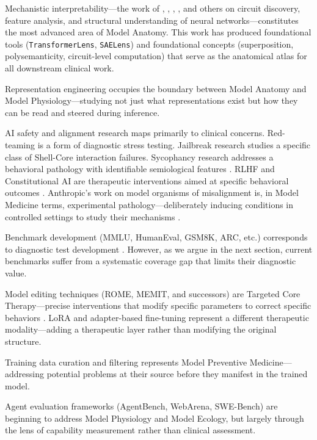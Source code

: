 \documentclass[11pt]{article}
\begin{document}
Mechanistic interpretability---the work of \citet{Olah2020}, \citet{Nanda2022}, \citet{Elhage2022}, \citet{Conmy2023}, and others on circuit discovery, feature analysis, and structural understanding of neural networks---constitutes the most advanced area of Model Anatomy. This work has produced foundational tools (\texttt{TransformerLens}, \texttt{SAELens}) and foundational concepts (superposition, polysemanticity, circuit-level computation) that serve as the anatomical atlas for all downstream clinical work.

Representation engineering \citep{Zou2023} occupies the boundary between Model Anatomy and Model Physiology---studying not just what representations exist but how they can be read and steered during inference.

AI safety and alignment research maps primarily to clinical concerns. Red-teaming is a form of diagnostic stress testing. Jailbreak research studies a specific class of Shell-Core interaction failures. Sycophancy research addresses a behavioral pathology with identifiable semiological features \citep{Sharma2023}. RLHF and Constitutional AI are therapeutic interventions aimed at specific behavioral outcomes \citep{Anthropic2024}. Anthropic's work on model organisms of misalignment is, in Model Medicine terms, experimental pathology---deliberately inducing conditions in controlled settings to study their mechanisms \citep{Hubinger2021}.

Benchmark development (MMLU, HumanEval, GSM8K, ARC, etc.) corresponds to diagnostic test development \citep{Hendrycks2021,Chen2021code}. However, as we argue in the next section, current benchmarks suffer from a systematic coverage gap that limits their diagnostic value.

Model editing techniques (ROME, MEMIT, and successors) are Targeted Core Therapy---precise interventions that modify specific parameters to correct specific behaviors \citep{Meng2022,Meng2023}. LoRA and adapter-based fine-tuning represent a different therapeutic modality---adding a therapeutic layer rather than modifying the original structure.

Training data curation and filtering represents Model Preventive Medicine---addressing potential problems at their source before they manifest in the trained model.

Agent evaluation frameworks (AgentBench, WebArena, SWE-Bench) are beginning to address Model Physiology and Model Ecology, but largely through the lens of capability measurement rather than clinical assessment.
\end{document}
